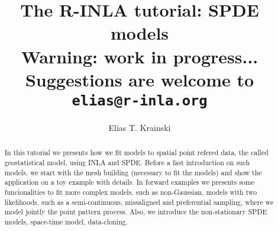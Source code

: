 \documentclass[a4paper,11pt]{report}
\title{\textbf{The R-INLA tutorial: SPDE models}\\
Warning: work in progress...\\
Suggestions are welcome to \texttt{elias@r-inla.org}}
\author{Elias T. Krainski}
\begin{document}
\maketitle

\begin{abstract}
  In this tutorial we presents how we fit models 
  to spatial point refered data, the called 
  geostatistical model, using INLA and SPDE. 
  Before a fast introduction on such models, 
  we start with the mesh building 
  (necessary to fit the models) and show the application 
  on a toy example with details. 
  In forward examples we presents some funcionalities 
  to fit more complex models, such as  non-Gaussian,  
  models with two likelihoods, such as a semi-continuous,  
  missaligned and preferential sampling, where we model 
  jointly the point pattern process. Also, we introduce 
  the non-stationary SPDE models, space-time model, data-cloning.
\end{abstract} 

 

\tableofcontents

 

 
 
 
 
 
 
 
 



\end{document}
